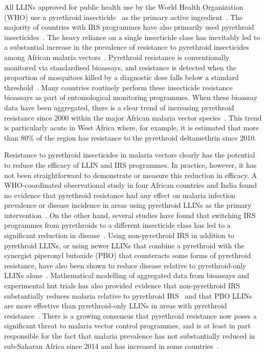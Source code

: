 \begin{refsection}
All LLINs approved for public health use by the World Health Organization (WHO) use a pyrethroid insecticide~\parencite{Elliott1989} as the primary active ingredient~\parencite{WHO2020PQVC}. 
%
The majority of countries with IRS programmes have also primarily used pyrethroid insecticides~\parencite{WHO2019WMR,Tangena2020}.
%
The heavy reliance on a single insecticide class has inevitably led to a substantial increase in the prevalence of resistance to pyrethroid insecticides among African malaria vectors~\parencite{Hemingway2016}. 
%
Pyrethroid resistance is conventionally monitored via standardised bioassays, and resistance is detected when the proportion of mosquitoes killed by a diagnostic dose falls below a standard threshold~\parencite{WHO2018TPIRM}. 
%
Many countries routinely perform these insecticide resistance bioassays as part of entomological monitoring programmes. 
%
When these bioassay data have been aggregated, there is a clear trend of increasing pyrethroid resistance since 2000 within the major African malaria vector species~\parencite{Hancock2020}. 
%
This trend is particularly acute in West Africa where, for example, it is estimated that more than 80\% of the region has resistance to the pyrethroid deltamethrin since 2010. 


Resistance to pyrethroid insecticides in malaria vectors clearly has the potential to reduce the efficacy of LLIN and IRS programmes.
%
In practice, however, it has not been straightforward to demonstrate or measure this reduction in efficacy.
%
A WHO-coordinated observational study in four African countries and India found no evidence that pyrethroid resistance had any effect on malaria infection prevalence or disease incidence in areas using pyrethroid LLINs as the primary intervention~\parencite{Kleinschmidt2018}.
%
On the other hand, several studies have found that switching IRS programmes from pyrethroids to a different insecticide class has led to a significant reduction in disease~\parencite{Hargreaves2000,Kafy2017}. 
%
Using non-pyrethroid IRS in addition to pyrethroid LLINs, or using newer LLINs that combine a pyrethroid with the synergist piperonyl butoxide (PBO) that counteracts some forms of pyrethroid resistance, have also been shown to reduce disease relative to pyrethroid-only LLINs alone~\parencite{Protopopoff2018}. 
%
Mathematical modelling of aggregated data from bioassays and experimental hut trials has also provided evidence that non-pyrethroid IRS substantially reduces malaria relative to pyrethroid IRS~\parencite{SherrardSmith2018} and that PBO LLINs are more effective than pyrethroid-only LLINs in areas with pyrethroid resistance~\parencite{Churcher2016}.
%
There is a growing consensus that pyrethroid resistance now poses a significant threat to malaria vector control programmes, and is at least in part responsible for the fact that malaria prevalence has not substantially reduced in sub-Saharan Africa since 2014 and has increased in some countries~\parencite{Hemingway2016,WHO2019WMR}. 



\end{refsection}
